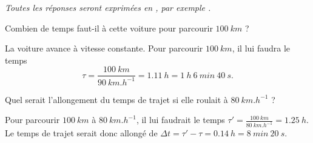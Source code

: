 {\itshape Toutes les réponses seront exprimées en , par exemple .} 

\debutEntrainement


\begin{enonce}
Combien de temps faut-il à cette voiture pour parcourir $\SI{100}{km}$ ?
\end{enonce}


\begin{corrige}
La voiture avance à vitesse constante.
Pour parcourir $\SI{100}{km}$, il lui faudra le temps 
\[
\tau=\frac{\SI{100}{km}}{\SI{90}{km.h^{-1}}}=\SI{1,11}{h}=\SI{1}{h} \ \SI{6}{min}\ \SI{40}{s}.
\] 
\end{corrige}





\begin{enonce}
Quel serait l'allongement du temps de trajet si elle roulait à $\SI{80}{km.h^{-1}}$ ?
\end{enonce}


\begin{corrige}
	Pour parcourir $\SI{100}{km}$ à $\SI{80}{km.h^{-1}}$, il lui faudrait le temps $\tau'=\frac{\SI{100}{km}}{\SI{80}{km.h^{-1}}}=\SI{1,25}{h}$.
	Le temps de trajet serait donc allongé de $\Delta t=\tau'-\tau=\SI{0,14}{h}= \SI{8}{min}\ \SI{20}{s}$. 
\end{corrige}


\finEntrainement







